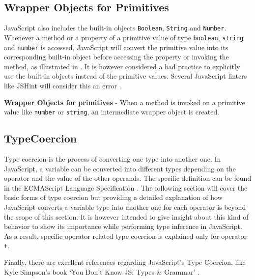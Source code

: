 \subsection{Wrapper Objects for Primitives}
JavaScript also includes the built-in objects \texttt{Boolean}, \texttt{String} and \texttt{Number}. Whenever a method or a property of a primitive value of type \texttt{boolean}, \texttt{string} and \texttt{number} is accessed, JavaScript will convert the primitive value into its corresponding built-in object before accessing the property or invoking the method, as illustrated in . It is however considered a bad practice to explicitly use the built-in objects instead of the primitive values. Several JavaScript linters like JSHint will consider this an error \citep{jshint-wrapper-objects-error}.

\begin{code}
	\captionsetup{aboveskip=0pt, belowskip=10pt}
	\caption[Wrapper Objects for primitives]{\textbf{Wrapper Objects for primitives} - When a method is invoked on a primitive value like \texttt{number} or \texttt{string}, an intermediate wrapper object is created.}
	\label{code:background-javascript-wrapper-objects}
\end{code}

\subsection{TypeCoercion} \label{sec:background-js-type-coercion}
Type coercion is the process of converting one type into another one. In JavaScript, a variable can be converted into different types depending on the operator and the value of the other operands. The specific definition can be found in the ECMAScript Language Specification \citep{ecma-script}. The following section will cover the basic forms of type coercion but providing a detailed explanation of how JavaScript converts a variable type into another one for each operator is beyond the scope of this section. It is however intended to give insight about this kind of behavior to show its importance while performing type inference in JavaScript. As a result, specific operator related type coercion is explained only for operator \texttt{+}.

Finally, there are excellent references regarding JavaScript's Type Coercion, like Kyle Simpson's book `You Don't Know JS: Types \& Grammar' \citep{you-dont-know-js}.

